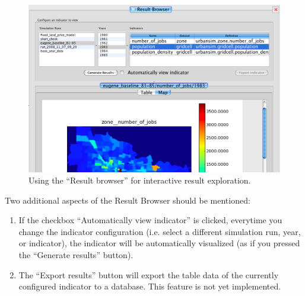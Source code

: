 \begin{figure}[htp]
\begin{center}
\includegraphics[width=1.0\textwidth]{part-gui/images/result-manager-result-browser.png}
\end{center}
\caption{Using the ``Result browser'' for interactive result
exploration.}
\label{fig:results-manager-result-browser}
\end{figure}


Two additional aspects of the Result Browser should be mentioned:
\begin{enumerate}
  \item If the checkbox ``Automatically view indicator'' is
  clicked, everytime you change the indicator configuration (i.e.
  select a different simulation run, year, or indicator), the
  indicator will be automatically visualized (as if you pressed the
  ``Generate results'' button). 
  \item The ``Export results'' button will export the table data
  of the currently configured indicator to a database. This feature
  is not yet implemented. 
\end{enumerate}

